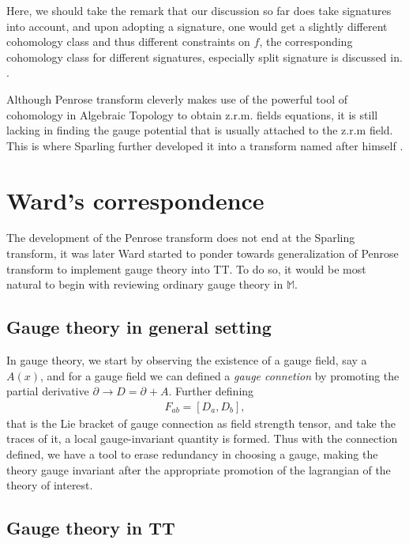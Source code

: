 \documentclass{article}
\begin{document}
 Here, we should take the remark that our discussion so far does take
 signatures into account, and upon adopting a signature, one would get a
slightly different cohomology class and thus different constraints
on $f$, the corresponding cohomology class for different signatures,
especially split signature is discussed in.
\cite{aryapoor2012penrose}.

 
 Although Penrose transform cleverly makes use of the powerful tool of
 cohomology in Algebraic Topology to obtain z.r.m. fields equations,
 it is still lacking in finding the gauge potential that is usually
 attached to the z.r.m field. This is where Sparling further developed it into a transform named after himself
 \cite{sparling1977dynamically}.

\section{Ward's correspondence}%
  \label{sec: Nonlinear Penrose transform (Ward's correspondence)}
  The development of the Penrose transform does not end at the Sparling
  transform, it was later Ward started to ponder towards
  generalization of Penrose transform\cite{ward1977self} to implement
  gauge theory into TT. To do so, it would be most natural to begin with
  reviewing ordinary gauge theory in $ \mathbb{M}$. 

  \subsection{Gauge theory in general setting}%
    \label{sub: Gauge theory review}
    In gauge theory, we start by observing the existence of a gauge
    field, say a $A(x)$, and for a gauge field we can defined a
    \textit{gauge connetion} by promoting the partial derivative $\partial_{}^{}
    \to D = \partial_{}^{} + A$. Further defining
    \begin{align}
      \label{twis}
      F_{ab} = [D_a, D_b],
    \end{align}
    that is the Lie bracket of gauge connection as field strength
    tensor, and take the traces of it, a local gauge-invariant quantity
    is formed. Thus with the connection defined, we have a tool to
    erase redundancy in choosing a gauge, making the theory gauge
    invariant after the appropriate promotion of the lagrangian of the
    theory of interest. 

    \subsection{Gauge theory in TT}%
      \label{sub: Gauge theory in TT}
      
\end{document}

